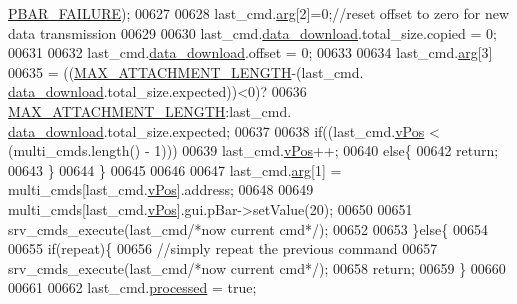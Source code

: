 \begin{DoxyCode}
      \hyperlink{a00034_aa9f43b2774395af6510910f8feed7cb4}{PBAR\_FAILURE});
00627                      
00628                      last\_cmd.\hyperlink{a00001_a56e6c2d7315d0ae60a51e8b140c9cfe4}{arg}[2]=0;\textcolor{comment}{//reset offset to zero for new data transmission}
00629                        
00630                      last\_cmd.\hyperlink{a00001_a5cfeaed4d4f8e51070a324c0ba893ebe}{data\_download}.total\_size.copied       = 0;
00631                      
00632                      last\_cmd.\hyperlink{a00001_a5cfeaed4d4f8e51070a324c0ba893ebe}{data\_download}.offset                  = 0;
00633                      
00634                      last\_cmd.\hyperlink{a00001_a56e6c2d7315d0ae60a51e8b140c9cfe4}{arg}[3]              
00635                              = ((\hyperlink{a00031_aa8abe3a822c64813f7aaba3ca7e3db9c}{MAX\_ATTACHMENT\_LENGTH}-(last\_cmd.
      \hyperlink{a00001_a5cfeaed4d4f8e51070a324c0ba893ebe}{data\_download}.total\_size.expected))<0)?
00636                                  \hyperlink{a00031_aa8abe3a822c64813f7aaba3ca7e3db9c}{MAX\_ATTACHMENT\_LENGTH}:last\_cmd.
      \hyperlink{a00001_a5cfeaed4d4f8e51070a324c0ba893ebe}{data\_download}.total\_size.expected;
00637                      
00638                      \textcolor{keywordflow}{if}((last\_cmd.\hyperlink{a00001_a2b48b371fd84be2a8ad581b1ad708b88}{vPos} < (multi\_cmds.length() - 1)))
00639                          last\_cmd.\hyperlink{a00001_a2b48b371fd84be2a8ad581b1ad708b88}{vPos}++;
00640                      \textcolor{keywordflow}{else}\{
00642                          \textcolor{keywordflow}{return};
00643                       \}
00644                      \}
00645 
00646 
00647                      last\_cmd.\hyperlink{a00001_a56e6c2d7315d0ae60a51e8b140c9cfe4}{arg}[1] = multi\_cmds[last\_cmd.\hyperlink{a00001_a2b48b371fd84be2a8ad581b1ad708b88}{vPos}].address;
00648 
00649                      multi\_cmds[last\_cmd.\hyperlink{a00001_a2b48b371fd84be2a8ad581b1ad708b88}{vPos}].gui.pBar->setValue(20);
00650 
00651                      srv\_cmds\_execute(last\_cmd\textcolor{comment}{/*now current cmd*/});
00652 
00653                  \}\textcolor{keywordflow}{else}\{
00654 
00655                      \textcolor{keywordflow}{if}(repeat)\{
00656                         \textcolor{comment}{//simply repeat the previous command}
00657                         srv\_cmds\_execute(last\_cmd\textcolor{comment}{/*now current cmd*/});
00658                         \textcolor{keywordflow}{return};
00659                      \}
00660 
00661 
00662                      last\_cmd.\hyperlink{a00001_a3e88f779da9798a5da7dda227e2ca388}{processed} = \textcolor{keyword}{true};

\end{DoxyCode}
